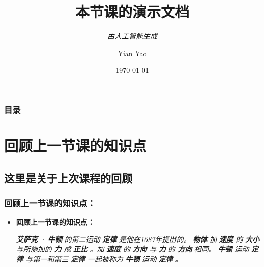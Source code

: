 \documentclass{beamer}%
\begin{document}
%
\normalsize%
\title{本节课的演示文档}%
\subtitle{\textit{由人工智能生成}}%
\author{Yian Yao}%
\date{\today}%
\maketitle%
\begin{frame}%
\frametitle{目录}%
\tableofcontents%
\end{frame}%
\section{回顾上一节课的知识点}%
\subsection{这里是关于上次课程的回顾}%
\begin{frame}%
\frametitle{\textsc{回顾上一节课的知识点：}}%
\begin{itemize}%
\item{\bf{回顾上一节课的知识点：}}%
\begin{itemize}%
\textit{}%
\textbf{\textit{艾萨克}}%
\textit{·}%
\textbf{\textit{牛顿}}%
\textit{的第二运动}%
\textbf{\textit{定律}}%
\textit{是他在1687年提出的。}%
\textbf{\textit{物体}}%
\textit{加}%
\textbf{\textit{速度}}%
\textit{的}%
\textbf{\textit{大小}}%
\textit{与所施加的}%
\textbf{\textit{力}}%
\textit{成}%
\textbf{\textit{正比}}%
\textit{。加}%
\textbf{\textit{速度}}%
\textit{的}%
\textbf{\textit{方向}}%
\textit{与}%
\textbf{\textit{力}}%
\textit{的}%
\textbf{\textit{方向}}%
\textit{相同。}%
\textbf{\textit{牛顿}}%
\textit{运动}%
\textbf{\textit{定律}}%
\textit{与第一和第三}%
\textbf{\textit{定律}}%
\textit{一起被称为}%
\textbf{\textit{牛顿}}%
\textit{运动}%
\textbf{\textit{定律}}%
\textit{。}%
\end{itemize}%
\end{itemize}%
\end{frame}%
\end{document}
